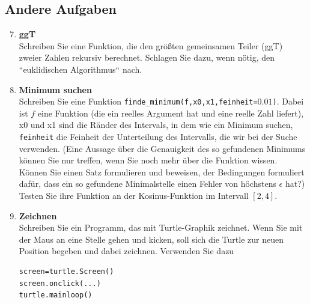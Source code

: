\subsection*{Andere Aufgaben}

\begin{enumerate}[1.]
\setcounter{enumi}{6}

\item \textbf{ggT}\\
Schreiben Sie eine Funktion, die den größten gemeinsamen Teiler (ggT)
zweier Zahlen rekursiv berechnet. Schlagen Sie dazu, wenn nötig, den
``euklidischen Algorithmus`` nach.
\item \textbf{Minimum suchen}\\
Schreiben Sie eine Funktion \texttt{finde\_minimum(f,x0,x1,feinheit=$0.01$)}. Dabei ist $f$ eine Funktion (die ein reelles 
Argument hat und eine reelle Zahl liefert), x0 und x1 sind die Ränder des Intervals, in dem wie ein
Minimum suchen, \texttt{feinheit} die Feinheit der Unterteilung des Intervalls, die wir bei der Suche verwenden.
(Eine Aussage über die Genauigkeit des so gefundenen Minimums können Sie nur treffen, wenn Sie 
noch mehr über die Funktion wissen. Können Sie einen Satz formulieren und beweisen, der Bedingungen
formuliert dafür, dass ein so gefundene Minimalstelle einen Fehler von höchstens $\epsilon$ hat?)
Testen Sie ihre Funktion an der Kosinus-Funktion im Intervall $[2,4]$. 






\item \textbf{Zeichnen} \\
Schreiben Sie ein Programm, das mit Turtle-Graphik zeichnet. Wenn Sie mit der Maus
an eine Stelle gehen und kicken, soll sich die Turtle zur neuen Position begeben und 
dabei zeichnen. Verwenden Sie dazu 
\begin{verbatim}
screen=turtle.Screen()
screen.onclick(...)
turtle.mainloop()
\end{verbatim}


\end{enumerate}
